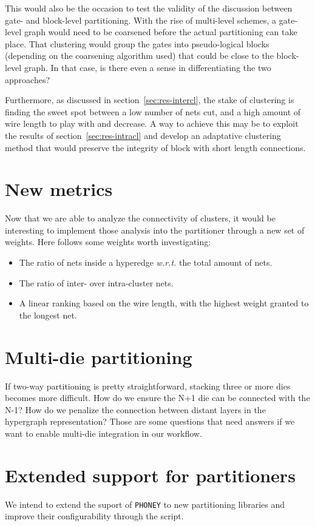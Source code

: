 \documentclass[11pt,a4paper]{report} %
\theoremstyle{customdef}
\begin{document}
This would also be the occasion to test the validity of the discussion between gate- and block-level partitioning.
With the rise of multi-level schemes, a gate-level graph would need to be coarsened before the actual partitioning can take place.
That clustering would group the gates into pseudo-logical blocks (depending on the coarsening algorithm used) that could be close to the block-level graph.
In that case, is there even a sense in differentiating the two approaches?

Furthermore, as discussed in section~\ref{sec:res-intercl}, the stake of clustering is finding the sweet spot between a low number of nets cut, and a high amount of wire length to play with and decrease.
A way to achieve this may be to exploit the results of section~\ref{sec:res-intracl} and develop an adaptative clustering method that would preserve the integrity of block with short length connections.




\section{New metrics}
Now that we are able to analyze the connectivity of clusters, it would be interesting to implement those analysis into the partitioner through a new set of weights.
Here follows some weights worth investigating:
\begin{itemize}
	\item The ratio of nets inside a hyperedge \textit{w.r.t.} the total amount of nets.
	\item The ratio of inter- over intra-cluster nets.
	\item A linear ranking based on the wire length, with the highest weight granted to the longest net.
\end{itemize}



\section{Multi-die partitioning}
If two-way partitioning is pretty straightforward, stacking three or more dies becomes more difficult.
How do we ensure the N+1 die can be connected with the N-1?
How do we penalize the connection between distant layers in the hypergraph representation?
Those are some questions that need answers if we want to enable multi-die integration in our workflow.

\section{Extended support for partitioners}
We intend to extend the suport of \texttt{PHONEY} to new partitioning libraries and improve their configurability through the script.

\clearpage

\newpage

% 

\end{document}
